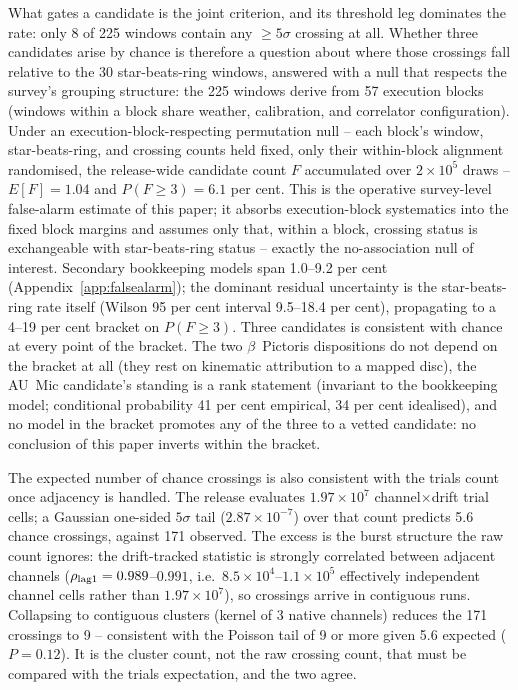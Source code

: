 \documentclass{openjournal}
\begin{document}
What gates a candidate is the joint criterion, and its threshold leg
dominates the rate: only 8 of 225 windows contain any $\geq5\sigma$
crossing at all. Whether three candidates arise by chance is
therefore a question about where those crossings fall relative to the
30 star-beats-ring windows, answered with a null that respects the
survey's grouping structure: the 225 windows derive from 57 execution
blocks (windows within a block share weather, calibration, and
correlator configuration). Under an execution-block-respecting
permutation null -- each block's window, star-beats-ring, and crossing
counts held fixed, only their within-block alignment randomised, the
release-wide candidate count $F$ accumulated over $2\times10^{5}$
draws -- $E[F]=1.04$ and $P(F\geq3)=6.1$ per cent. This is the
operative survey-level false-alarm estimate of this paper; it absorbs
execution-block systematics into the fixed block margins and assumes
only that, within a block, crossing status is exchangeable with
star-beats-ring status -- exactly the no-association null of
interest. Secondary bookkeeping models span 1.0--9.2 per cent
(Appendix~\ref{app:falsealarm}); the dominant residual uncertainty is
the star-beats-ring rate itself (Wilson 95 per cent interval 9.5--18.4
per cent), propagating to a 4--19 per cent bracket on $P(F\geq3)$.
Three candidates is consistent with chance at every point of the
bracket. The two $\beta$~Pictoris dispositions do not depend on the
bracket at all (they rest on kinematic attribution to a mapped disc),
the AU~Mic candidate's standing is a rank statement (invariant to the
bookkeeping model; conditional probability 41 per cent empirical, 34
per cent idealised), and no model in the bracket promotes any of the
three to a vetted candidate: no conclusion of this paper inverts
within the bracket.

The expected number of chance crossings is also consistent with the
trials count once adjacency is handled. The release evaluates
$1.97\times10^{7}$ channel$\times$drift trial cells; a Gaussian
one-sided $5\sigma$ tail ($2.87\times10^{-7}$) over that count
predicts 5.6 chance crossings, against 171 observed. The excess is
the burst structure the raw count ignores: the drift-tracked
statistic is strongly correlated between adjacent channels
($\rho_{\rm lag1}=0.989$--$0.991$, i.e.\ $8.5\times10^{4}$--$1.1\times10^{5}$
effectively independent channel cells rather than
$1.97\times10^{7}$), so crossings arrive in contiguous runs.
Collapsing to contiguous clusters (kernel of 3 native channels)
reduces the 171 crossings to 9 -- consistent with the Poisson tail of
9 or more given 5.6 expected ($P=0.12$). It is the cluster count, not
the raw crossing count, that must be compared with the trials
expectation, and the two agree.
\end{document}
